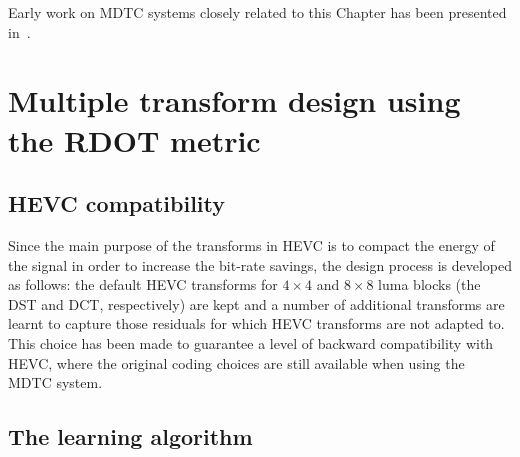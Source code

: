 \documentclass[11pt,a4paper,openright,twoside]{book}
\numberwithin{equation}{section} %
\numberwithin{figure}{section} %
\numberwithin{table}{section} %
\begin{document}
Early work on \ac{MDTC} systems closely related to this Chapter has been
presented in~\cite{arrufat-15-mdtc}.

\section{Multiple transform design using the \acs{RDOT} metric}
\label{sec:multiple_transform_design}

\subsection{\acs{HEVC} compatibility}
\label{sub:mdtc_hevc_compatibility}

Since the main purpose of the transforms in \ac{HEVC} is to compact the energy
of the signal in order to increase the bit-rate savings, the design process is
developed as follows:
the default \ac{HEVC} transforms for $4\times4$ and $8\times8$ luma blocks
(the \ac{DST} and \ac{DCT}, respectively) are kept and a number of additional
transforms are learnt to capture those residuals for which \ac{HEVC}
transforms are not adapted to.
This choice has been made to guarantee a level of backward compatibility with
\ac{HEVC}, where the original coding choices are still available when using
the \ac{MDTC} system.

\subsection{The learning algorithm}
\label{sub:mdtc_learning_algorithm}
\end{document}
